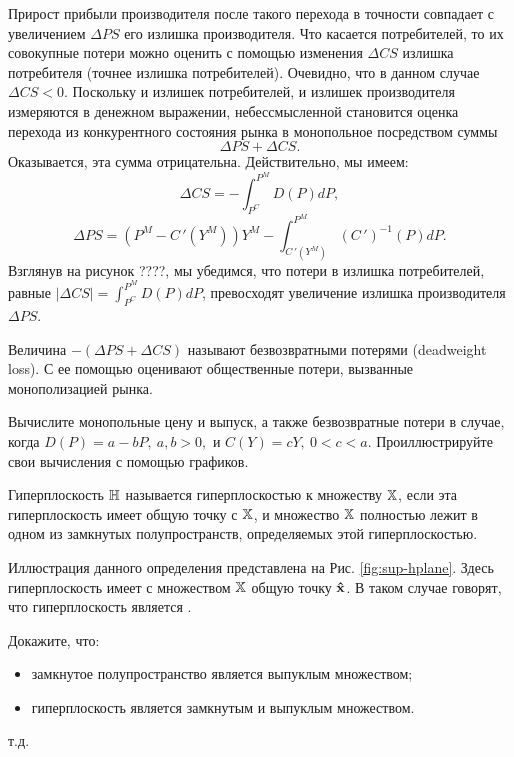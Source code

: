     Прирост прибыли производителя после такого перехода в точности
    совпадает с увеличением $\Delta PS$ его излишка производителя.
    Что касается потребителей, то их совокупные потери можно оценить
    с помощью изменения $\Delta CS$ излишка потребителя (точнее
    излишка потребителей). Очевидно, что в данном случае $\Delta CS<0$.
    Поскольку и излишек потребителей, и излишек производителя
    измеряются в денежном выражении, небессмысленной становится
    оценка перехода из конкурентного состояния рынка в монопольное
    посредством суммы
    \[\Delta PS+\Delta CS.\]
    Оказывается, эта сумма отрицательна. Действительно, мы имеем:
    \[\Delta CS=-\int_{P^{C}}^{P^{M}}D(P)dP,\]
    \[\Delta PS=(P^{M}-C\,'(Y^{M}))Y^{M}-\int_{C\,'(Y^{M})}^{P^{M}}(C\,')^{-1}(P)dP.\]
    Взглянув на рисунок ????, мы убедимся, что потери в излишка
    потребителей, равные $|\Delta CS|=\int_{P^{C}}^{P^{M}}D(P)dP$, превосходят увеличение
    излишка производителя $\Delta PS$.

    Величина $-(\Delta PS+\Delta CS)$
    называют безвозвратными потерями (deadweight loss). С ее помощью
    оценивают общественные потери, вызванные монополизацией рынка.
\begin{exer}
    Вычислите монопольные цену и выпуск, а также безвозвратные
    потери в случае, когда $D(P)=a-bP, \ a,b>0,$ и $C(Y)=cY, \
    0<c<a$. Проиллюстрируйте свои вычисления с помощью графиков.
\end{exer}

\begin{dfn}
Гиперплоскость $\mathbb{H}$ называется  гиперплоскостью к
множеству $\mathbb{X}$, если эта гиперплоскость имеет общую точку с
$\mathbb{X}$, и множество $\mathbb{X}$ полностью лежит в одном из замкнутых
полупространств, определяемых этой гиперплоскостью.\end{dfn}

Иллюстрация данного определения представлена на Рис.
\ref{fig:sup-hplane}. Здесь гиперплоскость имеет с множеством
$\mathbb{X}$ общую точку $\mathbf{\hat x}$. В таком случае говорят, что
гиперплоскость является .



\begin{exer}
Докажите, что:
\begin{itemize}
  \item замкнутое полупространство является выпуклым множеством;
  \item гиперплоскость является замкнутым и выпуклым множеством.
\end{itemize}
\end{exer}
т.д.


